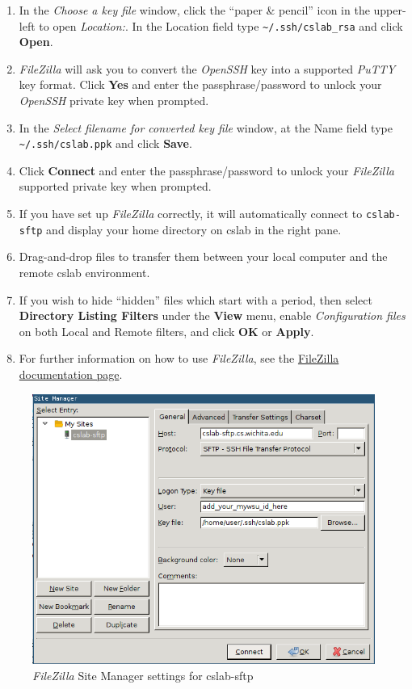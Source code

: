 \documentclass[12pt]{article}
\begin{document}
\begin{flushleft}
\begin{enumerate}
  \item In the \textit{Choose a key file} window, click the ``paper \& pencil'' icon in the upper-left to open \textit{Location:}. In the Location field type \verb|~/.ssh/cslab_rsa| and click \textbf{Open}.
  \item \textit{FileZilla} will ask you to convert the \textit{OpenSSH} key into a supported \textit{PuTTY} key format. Click \textbf{Yes} and enter the passphrase/password to unlock your \textit{OpenSSH} private key when prompted.
  \item In the \textit{Select filename for converted key file} window, at the Name field type \verb|~/.ssh/cslab.ppk| and click \textbf{Save}.
  \item Click \textbf{Connect} and enter the passphrase/password to unlock your \textit{FileZilla} supported private key when prompted.
  \item If you have set up \textit{FileZilla} correctly, it will automatically connect to \verb|cslab-sftp| and display your home directory on cslab in the right pane.
  \item Drag-and-drop files to transfer them between your local computer and the remote cslab environment.
  \item If you wish to hide ``hidden'' files which start with a period, then select \textbf{Directory Listing Filters} under the \textbf{View} menu, enable \textit{Configuration files} on both Local and Remote filters, and click \textbf{OK} or \textbf{Apply}.
  \item For further information on how to use \textit{FileZilla}, see the \href{https://wiki.filezilla-project.org/Documentation}{FileZilla documentation page}.
\end{enumerate}

\begin{figure}[bh!]
  \centering
  \centering
  \includegraphics[width=.6\linewidth]{filezilla_cslab_site_manager_linux}
\caption{\textit{FileZilla} Site Manager settings for cslab-sftp}
  \label{fig:pageant}
\end{figure}


\end{flushleft}
\end{document}
